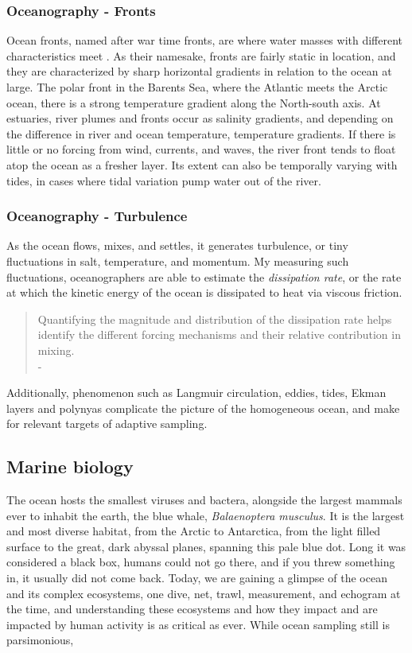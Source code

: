 \subsubsection*{Oceanography - Fronts}
Ocean fronts, named after war time fronts, are where water masses with different characteristics meet \cite{talley2011descriptive}. As their namesake, fronts are fairly static in location, and they are characterized by sharp horizontal gradients  in relation to the ocean at large. The polar front in the Barents Sea, where the Atlantic meets the Arctic ocean, there is a strong temperature gradient along the North-south axis. At estuaries, river plumes and fronts occur as salinity gradients, and depending on the difference in river and ocean temperature, temperature gradients. If there is little or no forcing from wind, currents, and waves, the river front tends to float atop the ocean as a fresher layer. Its extent can also be temporally varying with tides, in cases where tidal variation pump water out of the river. 

\subsubsection*{Oceanography - Turbulence}
As the ocean flows, mixes, and settles, it generates turbulence, or tiny fluctuations in salt, temperature, and momentum. My measuring such fluctuations, oceanographers are able to estimate the \textit{dissipation rate}, or the rate at which the kinetic energy of the ocean is dissipated to heat via viscous friction. 
\begin{quote}
    Quantifying the magnitude and
distribution of the dissipation rate helps identify the different forcing mechanisms and their relative contribution in mixing. \\
 - \textcite{kolas_technical_2021}
\end{quote}

Additionally, phenomenon such as Langmuir circulation, eddies,  tides, Ekman layers and polynyas \cite{talley2011descriptive} complicate the picture of the homogeneous ocean, and make for relevant targets of adaptive sampling. 

\subsection*{Marine biology}
The ocean hosts the smallest viruses and bactera, alongside the largest mammals ever to inhabit the earth, the blue whale, \textit{Balaenoptera musculus}. It is the largest and most diverse habitat, from the Arctic to Antarctica, from the light filled surface to the great, dark abyssal planes, spanning this pale blue dot. Long it was considered a black box, humans could not go there, and if you threw something in, it usually did not come back. Today, we are gaining a glimpse of the ocean and its complex ecosystems, one dive, net, trawl, measurement, and echogram at the time, and understanding these ecosystems and how they impact and are impacted by human activity is as critical as ever. While ocean sampling still is parsimonious, 


